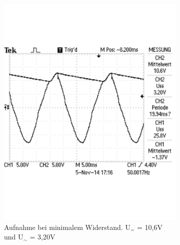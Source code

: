 \documentclass[12pt,a4paper]{article}
\begin{document}
\begin{figure}[H]
        \centering
        \begin{subfigure}[b]{0.48\textwidth}
                \includegraphics[width=\textwidth , scale = 0.4]{2_4_100F_1.pdf}
                \caption[Aufnahme bei minimalem Widerstand. U$_{=}$ = 10,6V und U$_\sim$ = 3,20V]{Aufnahme bei minimalem Widerstand. U$_{=}$ = 10,6V und U$_\sim$ = 3,20V}
 				 \label{fig:2_4_100F_1}
        \end{subfigure}%
        \hfill
        \begin{subfigure}[b]{0.48\textwidth}

\end{subfigure}
\end{figure}
\end{document}
